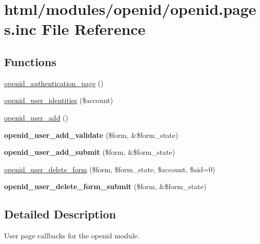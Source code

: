 \hypertarget{openid_8pages_8inc}{
\section{html/modules/openid/openid.pages.inc File Reference}
\label{openid_8pages_8inc}
}
\subsection*{Functions}
\begin{DoxyCompactItemize}
\item 
\hyperlink{openid_8pages_8inc_a4dd922a70115cdc900fdfd9afaa24f7b}{openid\_\-authentication\_\-page} ()
\item 
\hyperlink{openid_8pages_8inc_a0f409e32ec8c303f8143f13f79eae76c}{openid\_\-user\_\-identities} (\$account)
\item 
\hyperlink{group__forms_ga53081778c1fc8e8ff8ab89f9000774b7}{openid\_\-user\_\-add} ()
\item 
\hypertarget{openid_8pages_8inc_af97413d9c74c746bb7516d1917a88e2a}{
{\bfseries openid\_\-user\_\-add\_\-validate} (\$form, \&\$form\_\-state)}
\label{openid_8pages_8inc_af97413d9c74c746bb7516d1917a88e2a}

\item 
\hypertarget{openid_8pages_8inc_acd7a6972fa84954fda71166a59b17fe3}{
{\bfseries openid\_\-user\_\-add\_\-submit} (\$form, \&\$form\_\-state)}
\label{openid_8pages_8inc_acd7a6972fa84954fda71166a59b17fe3}

\item 
\hyperlink{openid_8pages_8inc_a35f3314da4ff4bb261372bf81b618cbc}{openid\_\-user\_\-delete\_\-form} (\$form, \$form\_\-state, \$account, \$aid=0)
\item 
\hypertarget{openid_8pages_8inc_aac850d86b78109116bc3644660f94074}{
{\bfseries openid\_\-user\_\-delete\_\-form\_\-submit} (\$form, \&\$form\_\-state)}
\label{openid_8pages_8inc_aac850d86b78109116bc3644660f94074}

\end{DoxyCompactItemize}


\subsection{Detailed Description}
User page callbacks for the openid module. 

